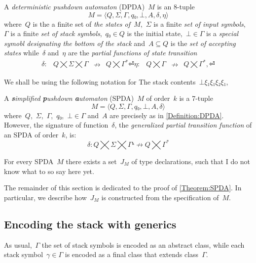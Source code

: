 \begin{Definition}
  \label{Definition:DPDA}
  A \emph{deterministic pushdown automaton} (DPDA)~$M$ is an 8-tuple
  \[
    M =⟨Q,Σ,Γ, q₀,⊥, A,δ,η⟩
  \]
  where~$Q$ is the a finite set of
  \emph{the states of~$M$},~$Σ$ is a finite
  \emph{set of input symbols},~$Γ$ is a finite
  \emph{set of stack symbols},~$q₀∈Q$ is the initial state,~$⊥∈Γ$
  is a \emph{special symobl designating the bottom of the stack}
  and~$A⊆Q$ is the \emph{set of accepting states} while~$δ$ and~$η$ are
  the \emph{partial functions of state transition}
  \[
    \begin{array}{crlc}
      δ: & Q⨉Σ⨉Γ &↛& Q⨉Γ^*⏎
      η: & Q⨉Γ &↛& Q⨉Γ^*,⏎
    \end{array}
  \]
\end{Definition}
We shall be using the following notation for
The stack contents~$⊥ξ₁ξ₁ξ₂ξ₁$,

\begin{Definition}
  \label{Definition:SPDA}
  A \emph{\textbf simplified \textbf pushdown \textbf automaton} (SPDA)~$M$ of order~$k$ is a 7-tuple
  \[
    M =⟨Q,Σ,Γ,q₀,⊥, A,δ⟩
  \]
  where~$Q$,~$Σ$,~$Γ$,~$q₀$,~$⊥∈Γ$ and~$A$ are precisely as in \cref{Definition:DPDA}.
  However, the signature of function~$δ$, the \emph{generalized partial transition function}
  of an SPDA of order~$k$, is:
  \begin{equation}
    \label{Equation:generalized:transition}
      δ: Q⨉Σ⨉Γᵏ↛Q⨉Γ^*
    \end{equation}
\end{Definition}

\begin{Theorem}
  \label{Theorem:SPDA}
  For every SPDA~$M$ there exists a set~$J_M$ of \Java type declarations, such that
    I do not know what to so say here yet.
\end{Theorem}

The remainder of this section is dedicated to the proof of \cref{Theorem:SPDA}.
In particular, we describe how~$J_M$ is constructed from the
  specification of~$M$.

\subsection{Encoding the stack with \Java generics}
As usual,~$Γ$ the set of stack symbols is encoded as an abstract class,
  while each stack symbol~$γ∈Γ$ is encoded as a final class that
  extends class~$Γ$.

